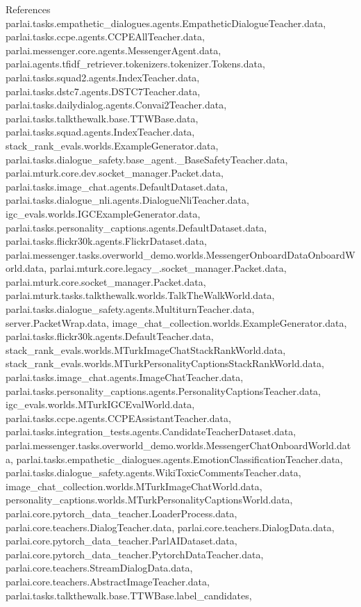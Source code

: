 References parlai.\+tasks.\+empathetic\+\_\+dialogues.\+agents.\+Empathetic\+Dialogue\+Teacher.\+data, parlai.\+tasks.\+ccpe.\+agents.\+C\+C\+P\+E\+All\+Teacher.\+data, parlai.\+messenger.\+core.\+agents.\+Messenger\+Agent.\+data, parlai.\+agents.\+tfidf\+\_\+retriever.\+tokenizers.\+tokenizer.\+Tokens.\+data, parlai.\+tasks.\+squad2.\+agents.\+Index\+Teacher.\+data, parlai.\+tasks.\+dstc7.\+agents.\+D\+S\+T\+C7\+Teacher.\+data, parlai.\+tasks.\+dailydialog.\+agents.\+Convai2\+Teacher.\+data, parlai.\+tasks.\+talkthewalk.\+base.\+T\+T\+W\+Base.\+data, parlai.\+tasks.\+squad.\+agents.\+Index\+Teacher.\+data, stack\+\_\+rank\+\_\+evals.\+worlds.\+Example\+Generator.\+data, parlai.\+tasks.\+dialogue\+\_\+safety.\+base\+\_\+agent.\+\_\+\+Base\+Safety\+Teacher.\+data, parlai.\+mturk.\+core.\+dev.\+socket\+\_\+manager.\+Packet.\+data, parlai.\+tasks.\+image\+\_\+chat.\+agents.\+Default\+Dataset.\+data, parlai.\+tasks.\+dialogue\+\_\+nli.\+agents.\+Dialogue\+Nli\+Teacher.\+data, igc\+\_\+evals.\+worlds.\+I\+G\+C\+Example\+Generator.\+data, parlai.\+tasks.\+personality\+\_\+captions.\+agents.\+Default\+Dataset.\+data, parlai.\+tasks.\+flickr30k.\+agents.\+Flickr\+Dataset.\+data, parlai.\+messenger.\+tasks.\+overworld\+\_\+demo.\+worlds.\+Messenger\+Onboard\+Data\+Onboard\+World.\+data, parlai.\+mturk.\+core.\+legacy\+\_.\+socket\+\_\+manager.\+Packet.\+data, parlai.\+mturk.\+core.\+socket\+\_\+manager.\+Packet.\+data, parlai.\+mturk.\+tasks.\+talkthewalk.\+worlds.\+Talk\+The\+Walk\+World.\+data, parlai.\+tasks.\+dialogue\+\_\+safety.\+agents.\+Multiturn\+Teacher.\+data, server.\+Packet\+Wrap.\+data, image\+\_\+chat\+\_\+collection.\+worlds.\+Example\+Generator.\+data, parlai.\+tasks.\+flickr30k.\+agents.\+Default\+Teacher.\+data, stack\+\_\+rank\+\_\+evals.\+worlds.\+M\+Turk\+Image\+Chat\+Stack\+Rank\+World.\+data, stack\+\_\+rank\+\_\+evals.\+worlds.\+M\+Turk\+Personality\+Captions\+Stack\+Rank\+World.\+data, parlai.\+tasks.\+image\+\_\+chat.\+agents.\+Image\+Chat\+Teacher.\+data, parlai.\+tasks.\+personality\+\_\+captions.\+agents.\+Personality\+Captions\+Teacher.\+data, igc\+\_\+evals.\+worlds.\+M\+Turk\+I\+G\+C\+Eval\+World.\+data, parlai.\+tasks.\+ccpe.\+agents.\+C\+C\+P\+E\+Assistant\+Teacher.\+data, parlai.\+tasks.\+integration\+\_\+tests.\+agents.\+Candidate\+Teacher\+Dataset.\+data, parlai.\+messenger.\+tasks.\+overworld\+\_\+demo.\+worlds.\+Messenger\+Chat\+Onboard\+World.\+data, parlai.\+tasks.\+empathetic\+\_\+dialogues.\+agents.\+Emotion\+Classification\+Teacher.\+data, parlai.\+tasks.\+dialogue\+\_\+safety.\+agents.\+Wiki\+Toxic\+Comments\+Teacher.\+data, image\+\_\+chat\+\_\+collection.\+worlds.\+M\+Turk\+Image\+Chat\+World.\+data, personality\+\_\+captions.\+worlds.\+M\+Turk\+Personality\+Captions\+World.\+data, parlai.\+core.\+pytorch\+\_\+data\+\_\+teacher.\+Loader\+Process.\+data, parlai.\+core.\+teachers.\+Dialog\+Teacher.\+data, parlai.\+core.\+teachers.\+Dialog\+Data.\+data, parlai.\+core.\+pytorch\+\_\+data\+\_\+teacher.\+Parl\+A\+I\+Dataset.\+data, parlai.\+core.\+pytorch\+\_\+data\+\_\+teacher.\+Pytorch\+Data\+Teacher.\+data, parlai.\+core.\+teachers.\+Stream\+Dialog\+Data.\+data, parlai.\+core.\+teachers.\+Abstract\+Image\+Teacher.\+data, parlai.\+tasks.\+talkthewalk.\+base.\+T\+T\+W\+Base.\+label\+\_\+candidates, 